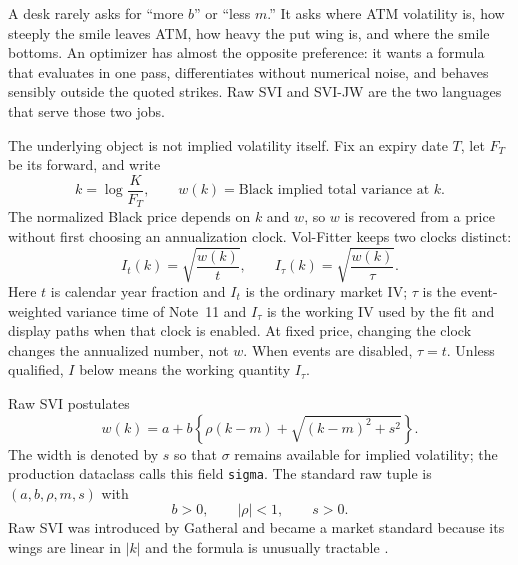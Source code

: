 \documentclass[11pt]{article}
\begin{document}
A desk rarely asks for ``more $b$'' or ``less $m$.''  It asks where ATM
volatility is, how steeply the smile leaves ATM, how heavy the put wing is, and
where the smile bottoms.  An optimizer has almost the opposite preference: it
wants a formula that evaluates in one pass, differentiates without numerical
noise, and behaves sensibly outside the quoted strikes.  Raw SVI and SVI-JW are
the two languages that serve those two jobs.

The underlying object is not implied volatility itself.  Fix an expiry date
$T$, let $F_T$ be its forward, and write
\begin{equation}
k=\log\frac{K}{F_T},\qquad w(k)=\text{Black implied total variance at }k.
\label{eq:rw_kw}
\end{equation}
The normalized Black price depends on $k$ and $w$, so $w$ is recovered from a
price without first choosing an annualization clock.  Vol-Fitter keeps two
clocks distinct:
\begin{equation}
I_t(k)=\sqrt{\frac{w(k)}{t}},\qquad
I_\tau(k)=\sqrt{\frac{w(k)}{\tau}}.
\label{eq:rw_two_clocks}
\end{equation}
Here $t$ is calendar year fraction and $I_t$ is the ordinary market IV;
$\tau$ is the event-weighted variance time of Note~11 and $I_\tau$ is the
working IV used by the fit and display paths when that clock is enabled.  At
fixed price, changing the clock changes the annualized number, not $w$.  When
events are disabled, $\tau=t$.  Unless qualified, $I$ below means the working
quantity $I_\tau$.

Raw SVI postulates
\begin{equation}
\boxed{
w(k)=a+b\left\{\rho(k-m)+\sqrt{(k-m)^2+s^2}\right\}.}
\label{eq:rw_raw}
\end{equation}
The width is denoted by $s$ so that $\sigma$ remains available for implied
volatility; the production dataclass calls this field \texttt{sigma}.  The
standard raw tuple is $(a,b,\rho,m,s)$ with
\begin{equation}
b>0,\qquad |\rho|<1,\qquad s>0.
\label{eq:rw_structural}
\end{equation}
Raw SVI was introduced by Gatheral and became a market standard because its
wings are linear in $|k|$ and the formula is unusually tractable
\cite{Gatheral2004,GatheralJacquier2014}.
\end{document}
